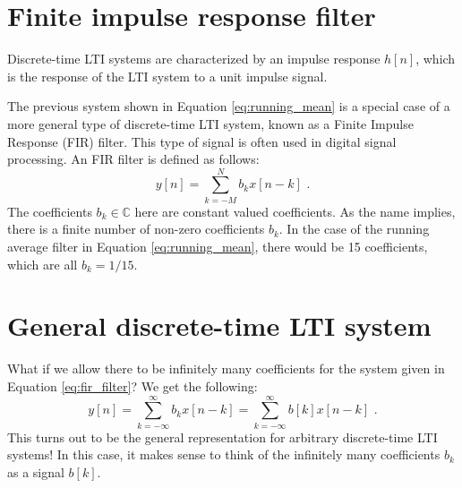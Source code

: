 \section{Finite impulse response filter}
\begin{marginfigure}

  \begin{center}
  \end{center}
  \caption{Discrete-time LTI systems are characterized by an impulse response $h[n]$, 
  which is the response of the LTI system to a unit impulse signal.}
\end{marginfigure}

The previous system shown in Equation \ref{eq:running_mean} is a special case of a 
more general type of discrete-time LTI system,
known as a Finite Impulse Response (FIR) filter. This type of signal is often 
used in digital signal processing.
An FIR filter is defined as follows:
\begin{equation}
  \boxed{
    y[n] = \sum_{k=-M}^{N} b_k x[n-k]\,\,.
  }
  \label{eq:fir_filter}
\end{equation}
The coefficients $b_k \in \mathbb{C}$ here are constant valued coefficients. 
As the name implies, there is a finite number of non-zero coefficients $b_k$.
In the case of the running average filter in Equation \ref{eq:running_mean}, 
there would be 15 coefficients, which are all $b_k=1/15$.

\section{General discrete-time LTI system}
What if we allow there to be infinitely many coefficients for the system given 
in Equation \ref{eq:fir_filter}? We get the following:
\begin{equation}
  y[n] = \sum_{k=-\infty}^{\infty} b_k x[n-k] = \sum_{k=-\infty}^{\infty} b[k] x[n-k]\,\,.
\end{equation}
This turns out to be the general representation for arbitrary discrete-time LTI systems! 
In this case, it makes sense to think of the infinitely many coefficients $b_k$ as a signal $b[k]$.

